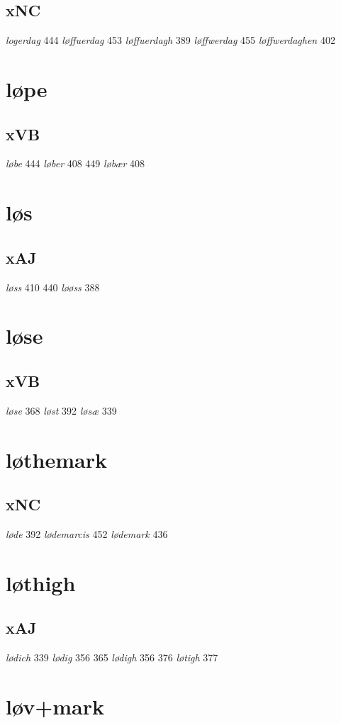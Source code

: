 \documentclass[a4paper,twocolumn]{article}
\begin{document}
\subsection{xNC}
\label{sec:org4cd2a77}
\emph{logerdag} 444 \emph{løffuerdag} 453 \emph{løffuerdagh} 389 \emph{løffwerdag} 455 \emph{løffwerdaghen} 402 
\section{løpe}
\label{sec:org546c0ec}
\subsection{xVB}
\label{sec:orgae6cca5}
\emph{løbe} 444 \emph{løber} 408 449 \emph{løbær} 408 
\section{løs}
\label{sec:org8cf0241}
\subsection{xAJ}
\label{sec:org324b220}
\emph{løss} 410 440 \emph{løøss} 388 
\section{løse}
\label{sec:org951510d}
\subsection{xVB}
\label{sec:org1473bf9}
\emph{løse} 368 \emph{løst} 392 \emph{løsæ} 339 
\section{løthemark}
\label{sec:org2608691}
\subsection{xNC}
\label{sec:org6101909}
\emph{løde} 392 \emph{lødemarcis} 452 \emph{lødemark} 436 
\section{løthigh}
\label{sec:orgd0f9367}
\subsection{xAJ}
\label{sec:org9d380c3}
\emph{lødich} 339 \emph{lødig} 356 365 \emph{lødigh} 356 376 \emph{løtigh} 377 
\section{løv+mark}
\label{sec:org0ee288c}
\end{document}
